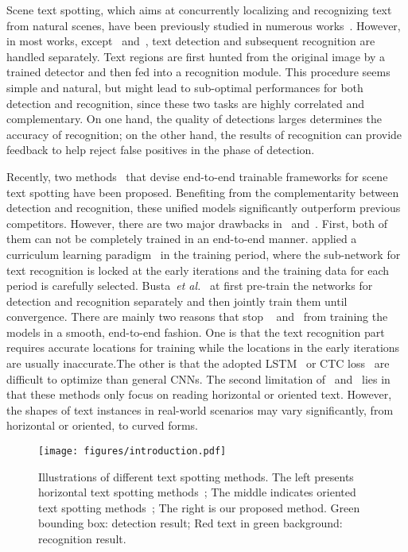 \documentclass[runningheads]{llncs}
\begin{document}
Scene text spotting, which aims at concurrently localizing and recognizing text from natural scenes, have been previously studied in numerous works~\cite{wang2011end,jaderberg2016reading}. However, in most works, except~\cite{Li_2017_ICCV} and~\cite{Busta_2017_ICCV}, text detection and subsequent recognition are handled separately. Text regions are first hunted from the original image by a trained detector and then fed into a recognition module. This procedure seems simple and natural, but might lead to sub-optimal performances for both detection and recognition, since these two tasks are highly correlated and complementary. On one hand, the quality of detections larges determines the accuracy of recognition; on the other hand, the results of recognition can provide feedback to help reject false positives in the phase of detection.

Recently, two methods~\cite{Li_2017_ICCV,Busta_2017_ICCV} that devise end-to-end trainable frameworks for scene text spotting have been proposed. Benefiting from the complementarity between detection and recognition, these unified models significantly outperform previous competitors. However, there are two major drawbacks in~\cite{Li_2017_ICCV} and~\cite{Busta_2017_ICCV}. First, both of them can not be completely trained in an end-to-end manner. \cite{Li_2017_ICCV} applied a curriculum learning paradigm~\cite{bengio2009curriculum} in the training period, where the sub-network for text recognition is locked at the early iterations and the training data for each period is carefully selected. Busta~\emph{et al.}~\cite{Busta_2017_ICCV} at first pre-train the networks for detection and recognition separately and then jointly train them until convergence. There are mainly two reasons that stop ~\cite{Li_2017_ICCV} and~\cite{Busta_2017_ICCV} from training the models in a smooth, end-to-end fashion. One is that the text recognition part requires accurate locations for training while the locations in the early iterations are usually inaccurate.The other is that the adopted LSTM~\cite{lstm} or CTC loss~\cite{graves2006connectionist} are difficult to optimize than general CNNs. The second limitation of~\cite{Li_2017_ICCV} and~\cite{Busta_2017_ICCV} lies in that these methods only focus on reading horizontal or oriented text. However, the shapes of text instances in real-world scenarios may vary significantly, from horizontal or oriented, to curved forms.

\begin{figure}[!b]
\begin{center}
\texttt{[image: figures/introduction.pdf]}
\end{center}
\caption{Illustrations of different text spotting methods. The left presents horizontal text spotting methods~\cite{liao2017textboxes,Li_2017_ICCV}; The middle indicates oriented text spotting methods~\cite{Busta_2017_ICCV}; The right is our proposed method. Green bounding box: detection result; Red text in green background: recognition result.}
\label{fig:introduction}
\end{figure}
\end{document}
